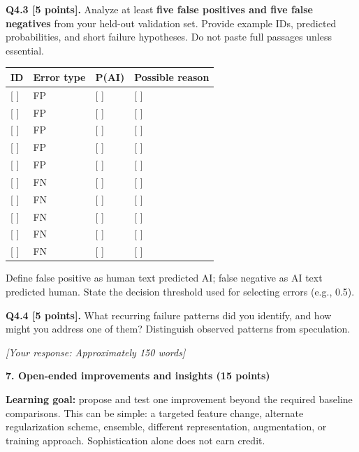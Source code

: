 \documentclass[11pt,letterpaper]{article}
\begin{document}
\vspace{8pt}
\textbf{Q4.3 [5 points].} Analyze at least \textbf{five false positives and five false negatives} from your held-out validation set. Provide example IDs, predicted probabilities, and short failure hypotheses. Do not paste full passages unless essential.

\vspace{2pt}
\begin{tabularx}{\textwidth}{@{}llp{2.0cm}X@{}}
\toprule
\textbf{ID} & \textbf{Error type} & \textbf{P(AI)} & \textbf{Possible reason} \\
\midrule
{}[ ] & FP & [ ] & [ ] \\
{}[ ] & FP & [ ] & [ ] \\
{}[ ] & FP & [ ] & [ ] \\
{}[ ] & FP & [ ] & [ ] \\
{}[ ] & FP & [ ] & [ ] \\
\midrule
{}[ ] & FN & [ ] & [ ] \\
{}[ ] & FN & [ ] & [ ] \\
{}[ ] & FN & [ ] & [ ] \\
{}[ ] & FN & [ ] & [ ] \\
{}[ ] & FN & [ ] & [ ] \\
\bottomrule
\end{tabularx}

\vspace{2pt}
{\footnotesize Define false positive as human text predicted AI; false negative as AI text predicted human. State the decision threshold used for selecting errors (e.g., 0.5).}

\vspace{6pt}
\textbf{Q4.4 [5 points].} What recurring failure patterns did you identify, and how might you address one of them? Distinguish observed patterns from speculation.

\textit{[Your response: Approximately 150 words]}

\newpage

{\large\textbf{7. Open-ended improvements and insights (15 points)}}
\vspace{2pt}

\textbf{Learning goal:} propose and test one improvement beyond the required baseline comparisons. This can be simple: a targeted feature change, alternate regularization scheme, ensemble, different representation, augmentation, or training approach. Sophistication alone does not earn credit.
\end{document}
